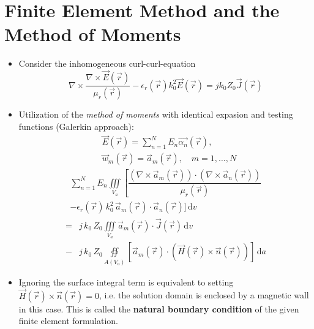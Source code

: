 \section{Finite Element Method and the Method of Moments}
\begin{itemize}
  \item Consider the inhomogeneous curl-curl-equation
        \begin{equation*}
          \nabla\times\dfrac{\nabla\times\vec{E}(\vec{r})}{\mu_{r}(\vec{r})} - \epsilon_{r}(\vec{r})k_{0}^{2}\vec{E}(\vec{r}) = jk_{0}Z_{0}\vec{J}(\vec{r})
        \end{equation*}
  \item Utilization of the \textit{method of moments} with identical expasion and testing functions (Galerkin approach):
        \begin{align*}
          &\vec{E}(\vec{r}) = \sum\limits_{n=1}^{N}E_{n}\vec{\alpha_{n}}(\vec{r}),\\
          &\vec{w}_{m}(\vec{r}) = \vec{a}_{m}(\vec{r}), \quad m=1,\dots,N
        \end{align*}
        \begin{align*}
          \sum\limits_{n=1}^{N}E_{n}\iiint\limits_{V_{a}}\left[\dfrac{(\nabla\times\vec{a}_{m}(\vec{r}))\cdot(\nabla\times\vec{a}_{n}(\vec{r}))}{\mu_{r}(\vec{r})}\right.\\
          - \epsilon_{r}(\vec{r})\,k_{0}^{2}\,\vec{a}_{m}(\vec{r})\cdot\vec{a}_{n}(\vec{r})\bigg]\,\mathrm{d}v
        \end{align*}
        \vspace{-5mm}
        \begin{align*}
          = &j\,k_{0}\,Z_{0} \iiint\limits_{V_{a}}\vec{a}_{m}(\vec{r})\cdot\vec{J}(\vec{r})\,\mathrm{d}v\\
          - &j\,k_{0}\,Z_{0} \oiint\limits_{A(V_{a})}\left[\vec{a}_{m}(\vec{r})\cdot(\vec{H}(\vec{r})\times\vec{n}(\vec{r}))\right]\,\mathrm{d}a
        \end{align*}
  \item Ignoring the surface integral term is equivalent to setting $\vec{H}(\vec{r})\times\vec{n}(\vec{r}) = 0$, i.e. the solution domain is enclosed by a magnetic wall in this case. This is called the \textbf{natural boundary condition} of the given finite element formulation.
\end{itemize}
